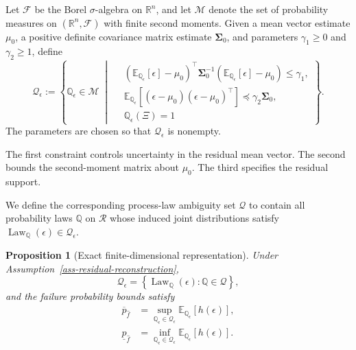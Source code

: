 \documentclass[review,11pt,3p,authoryear,nopreprintline]{elsarticle}
\newtheorem{proposition}{Proposition}
\begin{document}
\begin{definition}
  Let $\mathcal{F}$ be the Borel $\sigma$-algebra on
  $\mathbb{R}^{n}$, and let $\mathscr{M}$ denote the set
  of probability measures on $(\mathbb{R}^{n},\mathcal{F})$
  with finite second moments.
  Given a mean vector estimate $\mu_0$, a positive definite
  covariance matrix estimate $\mathbf{\Sigma}_0$, and
  parameters $\gamma_1\geq0$ and $\gamma_2\geq1$, define
  \begin{equation}
    \mathscr{Q}_{\epsilon}
    := \left\{
      \mathbb{Q}_{\epsilon}\in\mathscr{M}
      \;\middle|\;
      \begin{aligned}
        & \left(
            \mathbb{E}_{\mathbb{Q}_{\epsilon}}[\epsilon]-\mu_0
          \right)^{\top}
          \mathbf{\Sigma}_0^{-1}
          \left(
            \mathbb{E}_{\mathbb{Q}_{\epsilon}}[\epsilon]-\mu_0
          \right)
          \leq\gamma_1, \\
        & \mathbb{E}_{\mathbb{Q}_{\epsilon}}\!\left[
            (\epsilon-\mu_0)(\epsilon-\mu_0)^{\top}
          \right]
          \preceq\gamma_2\mathbf{\Sigma}_0, \\
        & \mathbb{Q}_{\epsilon}(\Xi)=1
      \end{aligned}
    \right\}.
    \label{eq-moment-ambiguity-set}
  \end{equation}
  The parameters are chosen so that
  $\mathscr{Q}_{\epsilon}$ is nonempty.
\end{definition}

The first constraint controls uncertainty in the residual
mean vector. The second bounds the second-moment matrix
about $\mu_0$. The third specifies the residual support.

We define the corresponding process-law ambiguity set
$\mathscr{Q}$ to contain all probability laws $\mathbb{Q}$
on $\mathcal{R}$ whose induced joint distributions satisfy
$\operatorname{Law}_{\mathbb{Q}}(\epsilon)
\in\mathscr{Q}_{\epsilon}$.

\begin{proposition}[Exact finite-dimensional representation]
\label{prop-exact-finite-representation}
  Under Assumption~\ref{ass-residual-reconstruction},
  \begin{equation}
    \mathscr{Q}_{\epsilon}
    =
    \left\{
      \operatorname{Law}_{\mathbb{Q}}(\epsilon):
      \mathbb{Q}\in\mathscr{Q}
    \right\},
    \label{eq-exact-induced-ambiguity-set}
  \end{equation}
  and the failure probability bounds satisfy
  \begin{equation}
    \begin{aligned}
      \overline{p}_{\hat{f}}
      &=
      \sup_{\mathbb{Q}_{\epsilon}\in\mathscr{Q}_{\epsilon}}
      \mathbb{E}_{\mathbb{Q}_{\epsilon}}[h(\epsilon)], \\
      \underline{p}_{\hat{f}}
      &=
      \inf_{\mathbb{Q}_{\epsilon}\in\mathscr{Q}_{\epsilon}}
      \mathbb{E}_{\mathbb{Q}_{\epsilon}}[h(\epsilon)].
    \end{aligned}
    \label{eq-finite-dimensional-bounds}
  \end{equation}
\end{proposition}
\end{document}
